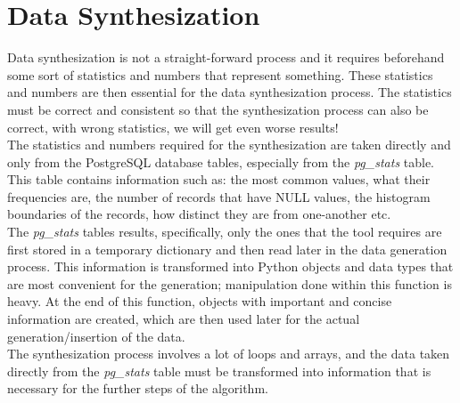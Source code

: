 \section{Data Synthesization}
Data synthesization is not a straight-forward process and it requires beforehand some sort of statistics and numbers that represent something. These statistics and numbers are then essential for the data synthesization process. The statistics must be correct and consistent so that the synthesization process can also be correct, with wrong statistics, we will get even worse results!\\
\newline
The statistics and numbers required for the synthesization are taken directly and only from the PostgreSQL database tables, especially from the \textit{pg\_stats} table. This table contains information such as: the most common values, what their frequencies are, the number of records that have NULL values, the histogram boundaries of the records, how distinct they are from one-another etc.\\
The \textit{pg\_stats} tables results, specifically, only the ones that the tool requires are first stored in a temporary dictionary and then read later in the data generation process. This information is transformed into Python objects and data types that are most convenient for the generation; manipulation done within this function is heavy. At the end of this function, objects with important and concise information are created, which are then used later for the actual generation/insertion of the data.\\
The synthesization process involves a lot of loops and arrays, and the data taken directly from the \textit{pg\_stats} table must be transformed into  information that is necessary for the further steps of the algorithm.
\newpage
